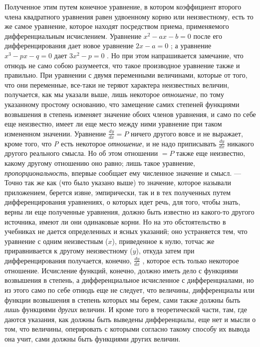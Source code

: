 Полученное этим путем конечное уравнение, в котором коэффициент второго члена
квадратного уравнения равен удвоенному корню или неизвестному, есть то же
самое уравнение, которое находят посредством приема, применяемого
дифференциальным исчислением. Уравнение  $x^2-\mathit{ax}-b=0$  после его
дифференцирования дает новое уравнение  $2x-a=0$ ; а уравнение 
$x^3-\mathit{px}-q=0$  дает  $3x^2-p=0$ . Но при этом напрашивается
замечание, что отнюдь не само собою разумеется, что такое производное
уравнение также и правильно. При уравнении с двумя переменными величинами,
которые от того, что они переменные, все-таки не теряют характера
неизвестных величин, получается, как мы указали выше, лишь некоторое
{\em отношение}, по тому указанному простому основанию,
что замещение самих степеней функциями возвышения в степень изменяет
значение обоих членов уравнения, и само по себе еще неизвестно, имеет ли
еще место между ними уравнение при таком измененном значении. Уравнение 
$\frac{\mathit{dy}}{\mathit{dx}}=P$  ничего другого вовсе и не выражает,
кроме того, что {\em P} есть некоторое
{\em отношение}, и не надо приписывать 
$\frac{\mathit{dy}}{\mathit{dx}}$ никакого другого реального смысла. Но об
этом отношении  $=P$  также еще неизвестно, какому другому отношению оно
равно; лишь такое уравнение, {\em пропорциональность},
впервые сообщает ему численное значение и смысл. — Точно так же как (что
было указано выше) то значение, которое называли приложением, берется
извне, эмпирически, так и в тех полученных путем дифференцирования
уравнениях, о которых идет речь, для того, чтобы знать, верны ли еще
полученные уравнения, должно быть известно из какого-то другого источника,
имеют ли они одинаковые корни. Но на это обстоятельство в учебниках не
дается определенных и ясных указаний; оно устраняется тем, что уравнение с
одним неизвестным ($x$), приведенное к нулю, тотчас
же приравнивается к другому неизвестному ($y$),
откуда затем при дифференцирования получается, конечно, 
$\frac{\mathit{dy}}{\mathit{dx}}$ , которое есть только некоторое
отношение. Исчисление функций, конечно, должно иметь дело с функциями
возвышения в степень, а дифференциальное исчисленное с дифференциалами, но из
этого само по себе отнюдь еще не следует, что величины, дифференциалы или
функции возвышения в степень которых мы берем, сами также должны быть
{\em лишь} функциями {\em других}
величин. И кроме того в теоретической части, там, где даются указания, как
должны быть выведены дифференциалы, еще нет и мысли о том, что величины,
оперировать с которыми согласно такому способу их вывода она учит, сами
должны быть функциями других величин.

